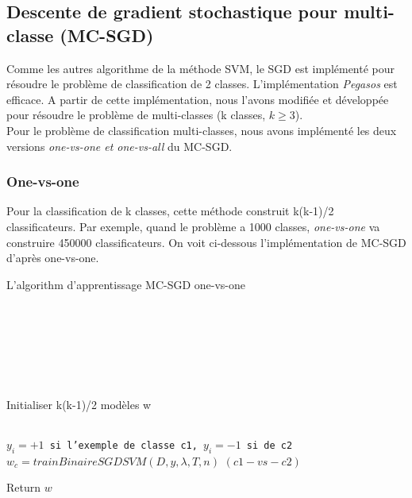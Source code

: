 \subsection{Descente de gradient stochastique pour multi-classe (MC-SGD)}
Comme les autres algorithme de la méthode SVM, le SGD est implémenté pour résoudre le problème de classification de 2 classes. L'implémentation \textit{Pegasos} \cite{sss07} est efficace. A partir de cette implémentation, nous l'avons modifiée et développée pour résoudre le problème de multi-classes (k classes, $k \geq 3$). \\

Pour le problème de classification multi-classes, nous avons implémenté les deux versions \textit{one-vs-one et one-vs-all} du MC-SGD.

\subsubsection{One-vs-one}
Pour la classification de k classes, cette méthode construit k(k-1)/2 classificateurs. Par exemple, quand le problème a 1000 classes, \textit{one-vs-one} va construire 450000 classificateurs. On voit ci-dessous l'implémentation de MC-SGD d'après one-vs-one.

\makeatletter
\def\BState{\State\hskip-\ALG@thistlm}
\makeatother

\begin{algorithm}[H]
\caption{L'algorithm d'apprentissage MC-SGD one-vs-one}\label{mcsgdal}
\begin{algorithmic}[1]

\\
\\
\\
\\
\\
\\

\State Initialiser k(k-1)/2 modèles w

\\
\State \texttt{$y_i = +1$ si l'exemple de classe c1, $y_i = -1$ si de c2}
\State \texttt{$w_c = trainBinaireSGDSVM(D, y, \lambda, T, n)$} $(c1-vs-c2)$
\EndFor
\EndFor


\State Return $w$

\EndProcedure
\end{algorithmic}
\end{algorithm}


